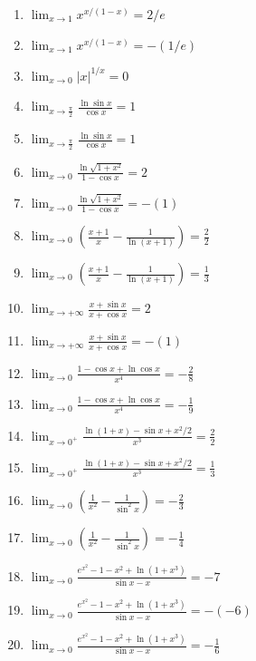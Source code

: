 \documentclass[11pt,a4paper]{article}
\begin{document}
\begin{enumerate}
\item $\displaystyle \lim_{x \to 1} x^{x/(1 - x)} = 2/e$
\item $\displaystyle \lim_{x \to 1} x^{x/(1 - x)} = -\left(1/e\right)$
\item $\displaystyle \lim_{x \to 0} \left|x\right|^{1/x} = 0$
\item $\displaystyle \lim_{x \to \frac{\pi}{2}} \frac{\ln\sin x}{\cos x} = 1$
\item $\displaystyle \lim_{x \to \frac{\pi}{2}} \frac{\ln\sin x}{\cos x} = 1$
\item $\displaystyle \lim_{x \to 0} \frac{\ln\sqrt{1 + x^{2}}}{1 - \cos x} = 2$
\item $\displaystyle \lim_{x \to 0} \frac{\ln\sqrt{1 + x^{2}}}{1 - \cos x} = -\left(1\right)$
\item $\displaystyle \lim_{x \to 0} \left(\frac{x + 1}{x} - \frac{1}{\ln(x + 1)}\right) = \frac{2}{2}$
\item $\displaystyle \lim_{x \to 0} \left(\frac{x + 1}{x} - \frac{1}{\ln(x + 1)}\right) = \frac{1}{3}$
\item $\displaystyle \lim_{x \to +\infty} \frac{x + \sin x}{x + \cos x} = 2$
\item $\displaystyle \lim_{x \to +\infty} \frac{x + \sin x}{x + \cos x} = -\left(1\right)$
\item $\displaystyle \lim_{x \to 0} \frac{1 - \cos x + \ln\cos x}{x^{4}} = -\frac{2}{8}$
\item $\displaystyle \lim_{x \to 0} \frac{1 - \cos x + \ln\cos x}{x^{4}} = -\frac{1}{9}$
\item $\displaystyle \lim_{x \to 0^{+}} \frac{\ln(1 + x) - \sin x + x^{2}/2}{x^{3}} = \frac{2}{2}$
\item $\displaystyle \lim_{x \to 0^{+}} \frac{\ln(1 + x) - \sin x + x^{2}/2}{x^{3}} = \frac{1}{3}$
\item $\displaystyle \lim_{x \to 0} \left(\frac{1}{x^{2}} - \frac{1}{\sin^{2} x}\right) = -\frac{2}{3}$
\item $\displaystyle \lim_{x \to 0} \left(\frac{1}{x^{2}} - \frac{1}{\sin^{2} x}\right) = -\frac{1}{4}$
\item $\displaystyle \lim_{x \to 0} \frac{e^{x^{2}} - 1 - x^{2} + \ln(1 + x^{3})}{\sin x - x} = -7$
\item $\displaystyle \lim_{x \to 0} \frac{e^{x^{2}} - 1 - x^{2} + \ln(1 + x^{3})}{\sin x - x} = -\left(-6\right)$
\item $\displaystyle \lim_{x \to 0} \frac{e^{x^{2}} - 1 - x^{2} + \ln(1 + x^{3})}{\sin x - x} = -\frac{1}{6}$

\end{enumerate}
\end{document}
